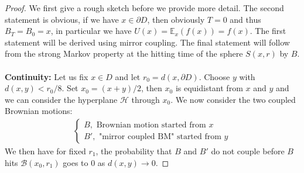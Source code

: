 \documentclass[../mainfile.tex]{subfiles}
\begin{document}
\begin{proof}
We first give a rough sketch before we provide more detail. The second statement is obvious, if we have $x \in \partial D$, then obviously $T=0$ and thus $B_T=B_0=x$, in particular we have $U(x)=\mathbb{E}_x(f(x))=f(x)$. The first statement will be derived using mirror coupling. The final statement will follow from the strong Markov property at the hitting time of the sphere $S(x,r)$ by $B$. 
\\\\
\textbf{Continuity:} Let us fix $x \in D$ and let $r_0=d(x, \partial D)$. Choose $y$ with $d(x,y) < r_0/8$. Set $x_0=(x+y)/2$, then $x_0$ is equidistant from $x$ and $y$ and we can consider the hyperplane $\mathcal{H}$ through $x_0$. We now consider the two coupled Brownian motions:
\begin{align*}
\begin{cases} B, \text{ Brownian motion started from $x$} \\
B', \text{ "mirror coupled BM" started from $y$}
\end{cases}
\end{align*}
We then have for fixed $r_1$, the probability that $B$ and $B'$ do not couple before $B$ hits $\mathcal{B}(x_0,r_1)$ goes to $0$ as $d(x,y) \to 0$. 


\end{proof}
\end{document}
